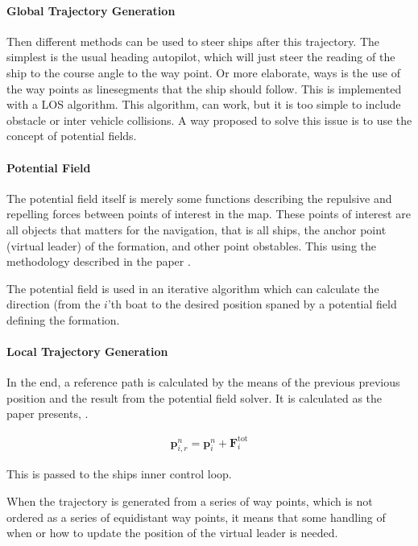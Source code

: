 \paragraph{Global Trajectory Generation}
Then different methods can be used to steer ships after this
trajectory. The simplest is the usual heading autopilot, which will
just steer the reading of the ship to the course angle to the
way point. Or more elaborate, ways is the use of the way points as
linesegments that the ship should follow. This is implemented with a
\ac{LOS} algorithm. This algorithm, can work, but it is too simple to
include obstacle or inter vehicle collisions. A way proposed to solve
this issue is to use the concept of potential fields.

\paragraph{Potential Field}
The potential field itself is merely some functions describing the
repulsive and repelling forces between points of interest in the map.
These points of interest are all objects that matters for the
navigation, that is all ships, the anchor point (virtual leader) of
the formation, and other point obstables. This using the methodology
described in the paper \citep{UAVff3dpf}.

The potential field is used in an iterative algorithm which can
calculate the direction (from the $i$'th boat to the desired position
spaned by a potential field defining the formation.

\paragraph{Local Trajectory Generation}
In the end, a reference path is calculated by the means of the
previous previous position and the result from the potential field
solver. It is calculated as the paper presents, \citep[eq.
48]{UAVff3dpf}.

\begin{align}
	\mathbf{p}_{i,r}^n = \mathbf{p}_i^n + \mathbf{F}_i ^\text{tot}
\end{align}

This is passed to the ships inner control loop.

When the trajectory is generated from a series of way points, which is
not ordered as a series of equidistant way points, it means that some
handling of when or how to update the position of the virtual leader
is needed.

